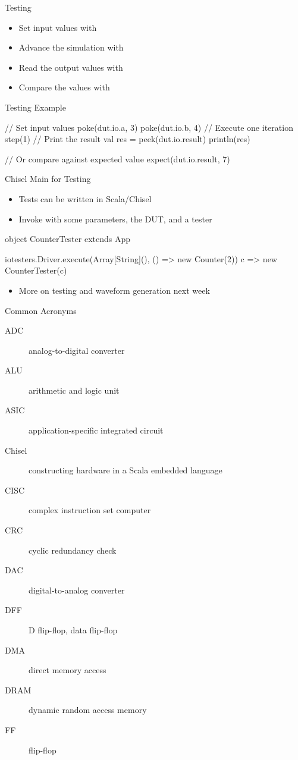\begin{frame}[fragile]{Testing}
\begin{itemize}
\item Set input values with 
\item Advance the simulation with 
\item Read the output values with 
\item Compare the values with 
\end{itemize}
\end{frame}

\begin{frame}[fragile]{Testing Example}
\begin{chisel}
// Set input values
poke(dut.io.a, 3)
poke(dut.io.b, 4)
// Execute one iteration
step(1)
// Print the result
val res = peek(dut.io.result)
println(res)

// Or compare against expected value
expect(dut.io.result, 7)
\end{chisel}
\end{frame}

\begin{frame}[fragile]{Chisel Main for Testing}
\begin{itemize}
\item Tests can be written in Scala/Chisel
\item Invoke  with some parameters, the DUT, and a tester
\end{itemize}
\begin{chisel}
object CounterTester extends App {

  iotesters.Driver.execute(Array[String](), () => new Counter(2)) {
    c => new CounterTester(c)
  }
}
\end{chisel}
\begin{itemize}
\item More on testing and waveform generation next week
\end{itemize}
\end{frame}


\begin{frame}[fragile]{Common Acronyms}
\begin{description}
\item [ADC] analog-to-digital converter
\item [ALU] arithmetic and logic unit
\item [ASIC] application-specific integrated circuit
\item [Chisel] constructing hardware in a Scala embedded language
\item [CISC] complex instruction set computer
\item [CRC] cyclic redundancy check
\item [DAC] digital-to-analog converter
\item [DFF] D flip-flop, data flip-flop
\item [DMA] direct memory access
\item [DRAM] dynamic random access memory
\item [FF] flip-flop
\end{description}
\end{frame}

